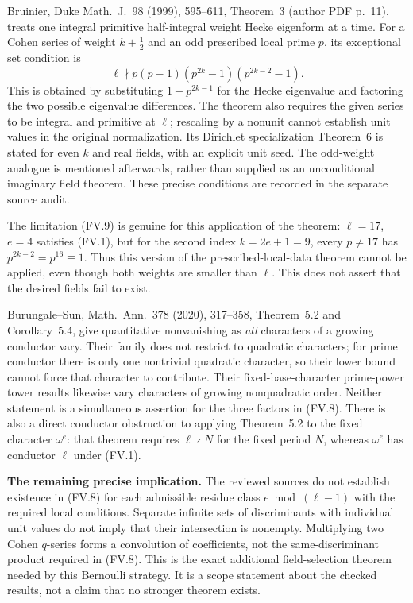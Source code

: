 \documentclass[11pt,a4paper]{article}
\theoremstyle{definition}
\renewcommand{\paragraph}[1]{\par\smallskip\noindent\textbf{#1}\quad\ignorespaces}
\begin{document}
Bruinier, Duke Math.~J.~98 (1999), 595--611, Theorem~3
(author PDF p.~11), treats one integral primitive half-integral
weight Hecke eigenform at a time.  For a Cohen series of weight
$k+\tfrac12$ and an odd prescribed local prime $p$, its exceptional
set condition is
\[
 \ell\nmid p(p-1)(p^{2k}-1)(p^{2k-2}-1).                    \tag{FV.9}
\]
This is obtained by substituting $1+p^{2k-1}$ for the Hecke
eigenvalue and factoring the two possible eigenvalue differences.
The theorem also requires the given series to be integral and
primitive at $\ell$; rescaling by a nonunit cannot establish
unit values in the original normalization.  Its Dirichlet
specialization Theorem~6 is stated for even $k$ and real fields,
with an explicit unit seed.  The odd-weight analogue is mentioned
afterwards, rather than supplied as an unconditional imaginary
field theorem.  These precise conditions are recorded in the
separate source audit.

The limitation (FV.9) is genuine for this application of the
theorem: $\ell=17$, $e=4$ satisfies (FV.1), but for the second
index $k=2e+1=9$, every $p\ne17$ has $p^{2k-2}=p^{16}\equiv1$.
Thus this version of the prescribed-local-data theorem cannot
be applied, even though both weights are smaller than $\ell$.
This does not assert that the desired fields fail to exist.

Burungale--Sun, Math.~Ann.~378 (2020), 317--358,
Theorem~5.2 and Corollary~5.4, give quantitative nonvanishing as
\emph{all} characters of a growing conductor vary.  Their family
does not restrict to quadratic characters; for prime conductor
there is only one nontrivial quadratic character, so their lower
bound cannot force that character to contribute.  Their
fixed-base-character prime-power tower results likewise vary
characters of growing nonquadratic order.  Neither statement is
a simultaneous assertion for the three factors in (FV.8).
There is also a direct conductor obstruction to applying
Theorem~5.2 to the fixed character $\omega^e$: that theorem
requires $\ell\nmid N$ for the fixed period $N$, whereas
$\omega^e$ has conductor $\ell$ under (FV.1).

\paragraph{The remaining precise implication.}
The reviewed sources do not establish existence in (FV.8) for
each admissible residue class $e\bmod(\ell-1)$ with the required
local conditions.  Separate infinite sets of discriminants with
individual unit values do not imply that their intersection is
nonempty.  Multiplying two Cohen $q$-series forms a convolution
of coefficients, not the same-discriminant product required in
(FV.8).  This is the exact additional field-selection theorem
needed by this Bernoulli strategy.  It is a scope statement about
the checked results, not a claim that no stronger theorem exists.
\end{document}
